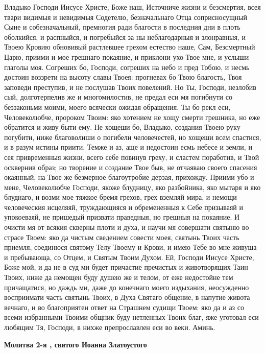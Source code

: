 Владыко Господи Иисусе Христе, Боже наш, Источниче жизни и безсмертия, всея твари видимыя и невидимыя Содетелю, безначальнаго Отца соприсносущный Сыне и собезначальный, премногия ради благости в последния дни в плоть оболкийся, и распныйся, и погребыйся за ны неблагодарныя и злонравныя, и Твоею Кровию обновивый растлевшее грехом естество наше, Сам, Безсмертный Царю, приими и мое грешнаго покаяние, и приклони ухо Твое мне, и услыши глаголы моя. Согреших бо, Господи, согреших на небо и пред Тобою, и несмь достоин воззрети на высоту славы Твоея: прогневах бо Твою благость, Твоя заповеди преступив, и не послушав Твоих повелений. Но Ты, Господи, незлобив сый, долготерпелив же и многомилостив, не предал еси мя погибнути со беззаконьми моими, моего всячески ожидая обращения. Ты бо рекл еси, Человеколюбче, пророком Твоим: яко хотением не хощу смерти грешника, но еже обратится и живу быти ему. Не хощеши бо, Владыко, создания Твоею руку погубити, ниже благоволиши о погибели человечестей, но хощеши всем спастися, и в разум истины приити. Темже и аз, аще и недостоин есмь небесе и земли, и сея привременныя жизни, всего себе повинув греху, и сластем поработив, и Твой осквернив образ; но творение и создание Твое быв, не отчаяваю своего спасения окаянный, на Твое же безмерное благоутробие дерзая, прихожду. Приими убо и мене, Человеколюбче Господи, якоже блудницу, яко разбойника, яко мытаря и яко блуднаго, и возми мое тяжкое бремя грехов, грех вземляй мира, и немощи человеческия исцеляяй, труждающияся и обремененныя к Себе призываяй и упокоеваяй, не пришедый призвати праведныя, но грешныя на покаяние. И очисти мя от всякия скверны плоти и духа, и научи мя совершати святыню во страсе Твоем: яко да чистым сведением совести моея, святынь Твоих часть приемля, соединюся святому Телу Твоему и Крови, и имею Тебе во мне живуща и пребывающа, со Отцем, и Святым Твоим Духом. Ей, Господи Иисусе Христе, Боже мой, и да не в суд ми будет причастие пречистых и животворящих Таин Твоих, ниже да немощен буду душею же и телом, от еже недостойне тем причащатися, но даждь ми, даже до конечнаго моего издыхания, неосужденно восприимати часть святынь Твоих, в Духа Святаго общение, в напутие живота вечнаго, и во благоприятен ответ на Страшнем судищи Твоем: яко да и аз со всеми избранными Твоими общник буду нетленных Твоих благ, яже уготовал еси любящим Тя, Господи, в нихже препрославлен еси во веки. Аминь.


\medskip
\bfseries Молитва 2-я , святого Иоанна Златоустого\normalfont{}\nopagebreak


